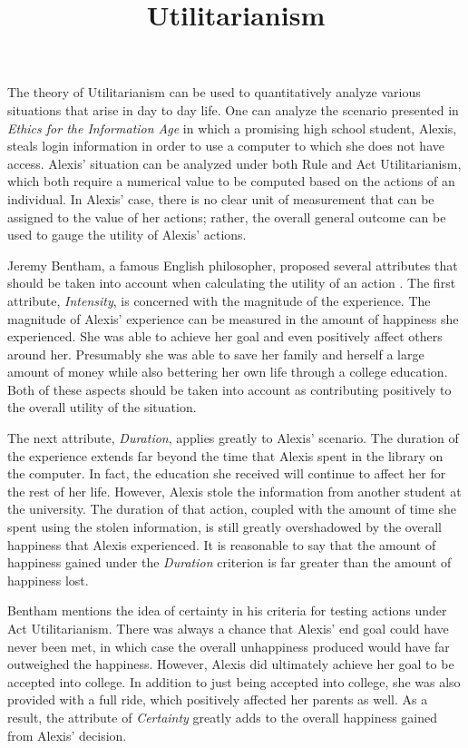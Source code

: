 \documentclass{paper}
\title{Utilitarianism}
\begin{document}
\finalh{}
\inlinetitle
\begin{linenumbers}

The theory of Utilitarianism can be used to quantitatively analyze various situations that arise in day to day life. One can analyze the scenario presented in \textit{Ethics for the Information Age} in which a promising high school student, Alexis, steals login information in order to use a computer to which she does not have access. Alexis' situation can be analyzed under both Rule and Act Utilitarianism, which both require a numerical value to be computed based on the actions of an individual. In Alexis' case, there is no clear unit of measurement that can be assigned to the value of her actions; rather, the overall general outcome can be used to gauge the utility of Alexis' actions.

Jeremy Bentham, a famous English philosopher, proposed several attributes that should be taken into account when calculating the utility of an action \cite[75]{ethics}. The first attribute, \textit{Intensity}, is concerned with the magnitude of the experience. The magnitude of Alexis' experience can be measured in the amount of happiness she experienced. She was able to achieve her goal and even positively affect others around her. Presumably she was able to save her family and herself a large amount of money while also bettering her own life through a college education. Both of these aspects should be taken into account as contributing positively to the overall utility of the situation.

The next attribute, \textit{Duration}, applies greatly to Alexis' scenario. The duration of the experience extends far beyond the time that Alexis spent in the library on the computer. In fact, the education she received will continue to affect her for the rest of her life. However, Alexis stole the information from another student at the university. The duration of that action, coupled with the amount of time she spent using the stolen information, is still greatly overshadowed by the overall happiness that Alexis experienced. It is reasonable to say that the amount of happiness gained under the \textit{Duration} criterion is far greater than the amount of happiness lost.

Bentham mentions the idea of certainty in his criteria for testing actions under Act Utilitarianism. There was always a chance that Alexis' end goal could have never been met, in which case the overall unhappiness produced would have far outweighed the happiness. However, Alexis did ultimately achieve her goal to be accepted into college. In addition to just being accepted into college, she was also provided with a full ride, which positively affected her parents as well. As a result, the attribute of \textit{Certainty} greatly adds to the overall happiness gained from Alexis' decision.


\end{linenumbers}
\end{document}
